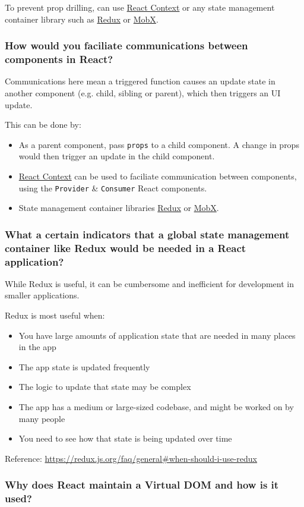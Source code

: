 \documentclass[12pt, a4paper]{article}
\newcommand{\code}[1]{\texttt{#1}}
\begin{document}
To prevent prop drilling, can use \href{https://reactjs.org/docs/context.html}{React Context} or any state management container library such as \href{https://redux.js.org/introduction/getting-started}{Redux} or \href{https://mobx.js.org/README.html}{MobX}.

\subsubsection*{How would you faciliate communications between components in React?}
Communications here mean a triggered function causes an update state in another component (e.g. child, sibling or parent), which then triggers an UI update.

This can be done by:
\begin{itemize}
  \item As a parent component, pass \code{props} to a child component.
        A change in props would then trigger an update in the child component.
  \item \href{https://reactjs.org/docs/context.html}{React Context} can be used to faciliate communication between components, using the \code{Provider} \& \code{Consumer} React components.
  \item State management container libraries \href{https://redux.js.org/introduction/getting-started}{Redux} or \href{https://mobx.js.org/README.html}{MobX}.
\end{itemize}

\subsubsection*{What a certain indicators that a global state management container like Redux would be needed in a React application?}
While Redux is useful, it can be cumbersome and inefficient for development in smaller applications.

Redux is most useful when:
\begin{itemize}
  \item You have large amounts of application state that are needed in many places in the app
  \item The app state is updated frequently
  \item The logic to update that state may be complex
  \item The app has a medium or large-sized codebase, and might be worked on by many people
  \item You need to see how that state is being updated over time
\end{itemize}

Reference: \url{https://redux.js.org/faq/general#when-should-i-use-redux}

\subsubsection*{Why does React maintain a Virtual DOM and how is it used?}
\end{document}
